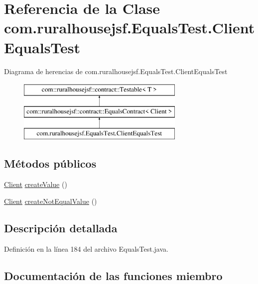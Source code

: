 \hypertarget{classcom_1_1ruralhousejsf_1_1_equals_test_1_1_client_equals_test}{}\section{Referencia de la Clase com.\+ruralhousejsf.\+Equals\+Test.\+Client\+Equals\+Test}
\label{classcom_1_1ruralhousejsf_1_1_equals_test_1_1_client_equals_test}
Diagrama de herencias de com.\+ruralhousejsf.\+Equals\+Test.\+Client\+Equals\+Test\begin{figure}[H]
\begin{center}
\leavevmode
\includegraphics[height=3.000000cm]{d1/db7/classcom_1_1ruralhousejsf_1_1_equals_test_1_1_client_equals_test}
\end{center}
\end{figure}
\subsection*{Métodos públicos}
\begin{DoxyCompactItemize}
\item 
\mbox{\hyperlink{classcom_1_1ruralhousejsf_1_1domain_1_1_client}{Client}} \mbox{\hyperlink{classcom_1_1ruralhousejsf_1_1_equals_test_1_1_client_equals_test_aa74f54ea042862db1a5499d31ec75539}{create\+Value}} ()
\item 
\mbox{\hyperlink{classcom_1_1ruralhousejsf_1_1domain_1_1_client}{Client}} \mbox{\hyperlink{classcom_1_1ruralhousejsf_1_1_equals_test_1_1_client_equals_test_a25218bb97f8e3d88b9dd7e13afd0a6ed}{create\+Not\+Equal\+Value}} ()
\end{DoxyCompactItemize}


\subsection{Descripción detallada}


Definición en la línea 184 del archivo Equals\+Test.\+java.



\subsection{Documentación de las funciones miembro}
\mbox{\label{classcom_1_1ruralhousejsf_1_1_equals_test_1_1_client_equals_test_a25218bb97f8e3d88b9dd7e13afd0a6ed}} 

